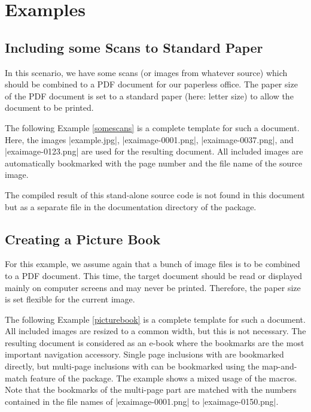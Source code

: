 \documentclass[a4paper,11pt]{ltxdoc}
\begin{document}
\clearpage

\section{Examples}

\subsection{Including some Scans to Standard Paper}
In this scenario, we have some scans (or images from whatever source) which
should be combined to a PDF document for our paperless office.
The paper size of the PDF document is set to a standard paper (here: letter size)
to allow the document to be printed.

The following Example \ref{somescans} is a complete template for such a document.
Here, the images |example.jpg|,
|exaimage-0001.png|,
|exaimage-0037.png|, and
|exaimage-0123.png| are used for the resulting document.
All included images are automatically bookmarked with the page number and
the file name of the source image.




The compiled result of this stand-alone source code is not found in this document but as
a separate file in the documentation directory of the package.



\clearpage
\subsection{Creating a Picture Book}
For this example, we assume again that a bunch of image files is to be
combined to a PDF document. This time, the target document should be read or
displayed mainly on computer screens and may never be printed. Therefore,
the paper size is set flexible for the current image.

The following Example \ref{picturebook} is a complete template for such a document.
All included images are resized to a common width, but this is not necessary.
The resulting document is considered as an e-book where the bookmarks are the
most important navigation accessory.
Single page inclusions with  are bookmarked directly, but
multi-page inclusions with  can be bookmarked using the
map-and-match feature of the package.
The example shows a mixed usage of the macros.
Note that the bookmarks of the multi-page part are matched with the numbers
contained in the file names of |exaimage-0001.png| to |exaimage-0150.png|.
\end{document}
